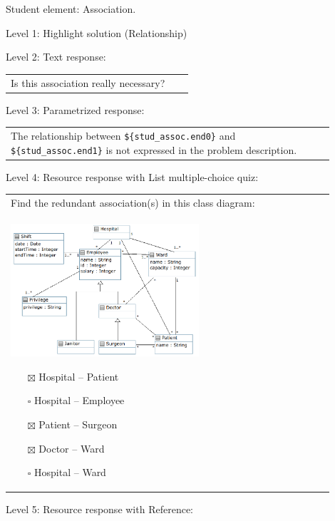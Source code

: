 Student element: Association.  \medskip

\noindent Level 1: Highlight solution (Relationship) \medskip

\noindent Level 2: Text response: \medskip

\begin{tabular}{|p{0.9\linewidth}}
Is this association really necessary?
\end{tabular} \medskip

\noindent Level 3: Parametrized response: \medskip

\begin{tabular}{|p{0.9\linewidth}}
The relationship between \verb|${stud_assoc.end0}| and \verb|${stud_assoc.end1}| is not expressed in the problem description.
\end{tabular} \medskip

\noindent Level 4: Resource response with List multiple-choice quiz: \medskip

\begin{tabular}{|p{0.9\linewidth}}

Find the redundant association(s) in this class diagram:

\\
\includegraphics[width=0.6\textwidth]{images/hospital_cdm_extra_assocs.png}

\begin{itemize}
    \item[$\boxtimes$] Hospital -- Patient
    \item[$\square$] Hospital -- Employee
    \item[$\boxtimes$] Patient -- Surgeon
    \item[$\boxtimes$] Doctor -- Ward
    \item[$\square$] Hospital -- Ward
\end{itemize}

\end{tabular} \medskip

\noindent Level 5: Resource response with Reference: \medskip

